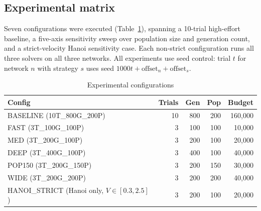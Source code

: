 \documentclass[conference]{IEEEtran}
\begin{document}
\subsection{Experimental matrix}
Seven configurations were executed (Table~\ref{tab:configs}), spanning a 10-trial high-effort baseline, a five-axis sensitivity sweep over population size and generation count, and a strict-velocity Hanoi sensitivity case. Each non-strict configuration runs all three solvers on all three networks. All experiments use seed control: trial $t$ for network $n$ with strategy $s$ uses seed $1000t + \text{offset}_n + \text{offset}_s$.

\begin{table}[t]
\caption{Experimental configurations}
\label{tab:configs}
\centering
\begin{tabular}{lrrrr}
\toprule
Config & Trials & Gen & Pop & Budget \\
\midrule
BASELINE (10T\_800G\_200P) & 10 & 800 & 200 & 160{,}000 \\
FAST (3T\_100G\_100P) & 3 & 100 & 100 & 10{,}000 \\
MED (3T\_200G\_100P) & 3 & 200 & 100 & 20{,}000 \\
DEEP (3T\_400G\_100P) & 3 & 400 & 100 & 40{,}000 \\
POP150 (3T\_200G\_150P) & 3 & 200 & 150 & 30{,}000 \\
WIDE (3T\_200G\_200P) & 3 & 200 & 200 & 40{,}000 \\
HANOI\_STRICT (Hanoi only, $V\!\in\![0.3,2.5]$) & 3 & 200 & 100 & 20{,}000 \\
\bottomrule
\end{tabular}
\end{table}
\end{document}
